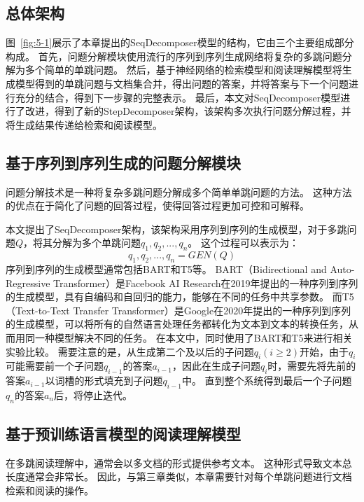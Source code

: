 \subsection{总体架构}
图~\ref{fig:5-1}展示了本章提出的SeqDecomposer模型的结构，它由三个主要组成部分构成。
首先，问题分解模块使用流行的序列到序列生成网络将复杂的多跳问题分解为多个简单的单跳问题。
然后，基于神经网络的检索模型和阅读理解模型将生成模型得到的单跳问题与文档集合并，得出问题的答案，并将答案与下一个问题进行充分的结合，得到下一步骤的完整表示。
最后，本文对SeqDecomposer模型进行了改进，得到了新的StepDecomposer架构，该架构多次执行问题分解过程，并将生成结果传递给检索和阅读模型。



\subsection{基于序列到序列生成的问题分解模块}
问题分解技术是一种将复杂多跳问题分解成多个简单单跳问题的方法。
这种方法的优点在于简化了问题的回答过程，使得回答过程更加可控和可解释。

本文提出了SeqDecomposer架构，该架构采用序列到序列的生成模型，对于多跳问题$Q$，将其分解为多个单跳问题$q_1,q_2,...,q_n$。
这个过程可以表示为：
\begin{equation}
    q_1,q_2,...,q_n = GEN(Q)
\end{equation}
序列到序列的生成模型通常包括BART和T5等。
BART\cite{Lewis2019BARTDS}（Bidirectional and Auto-Regressive Transformer）是Facebook AI Research在2019年提出的一种序列到序列的生成模型，具有自编码和自回归的能力，能够在不同的任务中共享参数。
而T5\cite{Ni2021SentenceT5SS}（Text-to-Text Transfer Transformer）是Google在2020年提出的一种序列到序列的生成模型，可以将所有的自然语言处理任务都转化为文本到文本的转换任务，从而用同一种模型解决不同的任务。
在本文中，同时使用了BART和T5来进行相关实验比较。
需要注意的是，从生成第二个及以后的子问题$q_i(i\geq 2)$开始，由于$q_i$可能需要前一个子问题$q_{i-1}$的答案$a_{i-1}$，因此在生成子问题$q_i$时，需要先将先前的答案$a_{i-1}$以词槽的形式填充到子问题$q_{i-1}$中。
直到整个系统得到最后一个子问题$q_{n}$的答案$a_{n}$后，将停止迭代。

\subsection{基于预训练语言模型的阅读理解模型}
在多跳阅读理解中，通常会以多文档的形式提供参考文本。
这种形式导致文本总长度通常会非常长。
因此，与第三章类似，本章需要针对每个单跳问题进行文档检索和阅读的操作。


